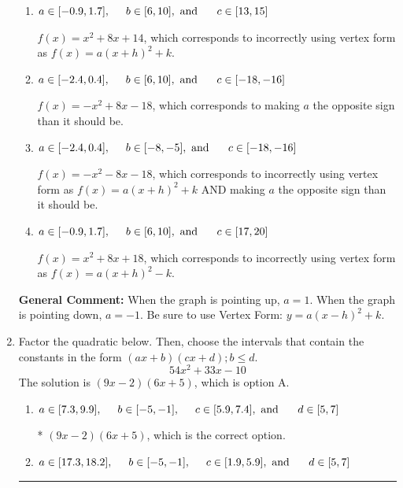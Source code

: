 \documentclass{extbook}[14pt]
\newcommand{\litem}[1]{\item #1

\rule{\textwidth}{0.4pt}}
\begin{document}
\begin{enumerate}
{\begin{enumerate}[label=\Alph*.]
* $f(x)=x^{2} -8 x + 14$, which is the correct option.
\item \( a \in [-0.9, 1.7], \hspace*{5mm} b \in [6, 10], \text{ and } \hspace*{5mm} c \in [13, 15] \)

$f(x)=x^{2} +8 x + 14$, which corresponds to incorrectly using vertex form as $f(x) = a(x+h)^2+k$.
\item \( a \in [-2.4, 0.4], \hspace*{5mm} b \in [6, 10], \text{ and } \hspace*{5mm} c \in [-18, -16] \)

$f(x)=-x^{2} +8 x -18$, which corresponds to making $a$ the opposite sign than it should be.
\item \( a \in [-2.4, 0.4], \hspace*{5mm} b \in [-8, -5], \text{ and } \hspace*{5mm} c \in [-18, -16] \)

$f(x)=-x^{2} -8 x -18$, which corresponds to incorrectly using vertex form as $f(x) = a(x+h)^2+k$ AND making $a$ the opposite sign than it should be.
\item \( a \in [-0.9, 1.7], \hspace*{5mm} b \in [6, 10], \text{ and } \hspace*{5mm} c \in [17, 20] \)

$f(x)=x^{2} +8 x + 18$, which corresponds to incorrectly using vertex form as $f(x) = a(x+h)^2 - k$.
\end{enumerate}

\textbf{General Comment:} When the graph is pointing up, $a=1$. When the graph is pointing down, $a=-1$. Be sure to use Vertex Form: $y = a(x-h)^2+k$.
}
\litem{
Factor the quadratic below. Then, choose the intervals that contain the constants in the form $(ax+b)(cx+d); b \leq d.$
\[ 54x^{2} +33 x -10 \]The solution is \( (9x -2)(6x + 5) \), which is option A.\begin{enumerate}[label=\Alph*.]
\item \( a \in [7.3, 9.9], \hspace*{5mm} b \in [-5, -1], \hspace*{5mm} c \in [5.9, 7.4], \text{ and } \hspace*{5mm} d \in [5, 7] \)

* $(9x -2)(6x + 5)$, which is the correct option.
\item \( a \in [17.3, 18.2], \hspace*{5mm} b \in [-5, -1], \hspace*{5mm} c \in [1.9, 5.9], \text{ and } \hspace*{5mm} d \in [5, 7] \)


\end{enumerate}}
\end{enumerate}
\end{document}
